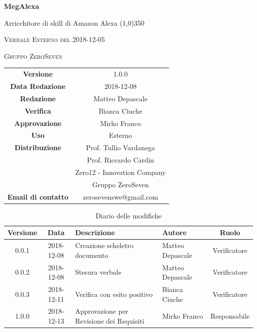\documentclass[a4paper,12pt]{article}
\author{Matteo Depascale}
\date{2018-12-08}
\begin{document}
\begin{titlepage}
	\centering
	{\huge\bfseries MegAlexa\par}
	Arricchitore di skill di Amazon Alexa
	\line(1,0){350} \\
	{\scshape\LARGE Verbale Esterno del 2018-12-05 \par}
	\vspace{1cm}
	{\scshape Gruppo ZeroSeven \par}
	\logo
	\begin{tabular}{c|c}
		{\hfill \textbf{Versione}} 			& 1.0.0				\\
		{\hfill\textbf{Data Redazione}} 	& 2018-12-08		\\ 
		{\hfill\textbf{Redazione}} 			&  		Matteo Depascale			\\ 
		{\hfill\textbf{Verifica}} 				&  		Bianca Ciuche		\\ 
		{\hfill\textbf{Approvazione}} 		&  		Mirko Franco	\\ 
		{\hfill\textbf{Uso}} 					& 	Esterno	\\ 
		{\hfill\textbf{Distribuzione}} 			& 			Prof. Tullio Vardanega \\ & Prof. Riccardo Cardin \\ & Zero12 - Innovation Company \\ & Gruppo ZeroSeven		\\ 
		{\hfill\textbf{Email di contatto}} & zerosevenswe@gmail.com \\
	\end{tabular}
\end{titlepage}
	

	
	\label{LastFrontPage}
	

	\newpage
	\cleardoublepage
		\begin{table}[tbph]
		\centering
		\begin{tabularx}{\textwidth}{|c|c|X|X|c|}
			\hline
			\textbf{Versione} & \textbf{Data} & \textbf{Descrizione} & \textbf{Autore} & \textbf{Ruolo} \\
			\hline
			0.0.1 & 2018-12-08 & Creazione scheletro documento
			& Matteo Depascale & Verificatore\\
			\hline
			0.0.2 & 2018-12-08 & Stesura verbale & Matteo Depascale & Verificatore \\
			\hline
			0.0.3 & 2018-12-11 & Verifica con esito positivo & Bianca Ciuche & Verificatore \\
			\hline
			1.0.0 & 2018-12-13 & Approvazione per Revisione dei Requisiti & Mirko Franco & Responsabile \\
			\hline
		\end{tabularx}
		\caption{Diario delle modifiche}
	\end{table}
	
\end{document}
